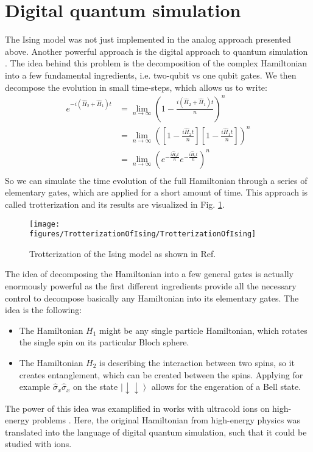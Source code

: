 \documentclass[10pt]{article}
\let\cite\citep
\providecommand\citep{\cite}
\newcommand{\ket}[1]{\ensuremath{\left|#1\right\rangle}}
\begin{document}
\section{Digital quantum simulation}

The Ising model was not just implemented in the analog approach presented above. Another  powerful approach is the digital approach to quantum simulation \cite{Lanyon_2011}.   The idea behind this problem is the decomposition of the complex Hamiltonian into a few fundamental ingredients, i.e. two-qubit vs one qubit gates. We then decompose the evolution in small time-steps, which allows us to write:
\begin{align}
e^{-i(\hat{H}_2 +\hat{H}_1)t}&=\lim_{n\rightarrow \infty}\left(1-\frac{i(\hat{H}_2 +\hat{H}_1)t}{n}\right)^n\\
&=\lim_{n\rightarrow \infty}\left(\left[1-\frac{i\hat{H}_2 t}{n}\right]\left[1-\frac{i\hat{H}_1t}{n}\right]\right)^n\\
&=\lim_{n\rightarrow \infty}\left(e^{-\frac{i\hat{H}_2 t}{n}}e^{-\frac{i\hat{H}_1t}{n}}\right)^n\\
\end{align}
So we can simulate the time evolution of the full Hamiltonian through a series of elementary gates, which are applied for a short amount of time. This approach is called trotterization and its results are visualized in Fig. \ref{866769}.
\begin{figure}[h!]
\begin{center}
\texttt{[image: figures/TrotterizationOfIsing/TrotterizationOfIsing]}
\caption{{Trotterization of the Ising model as shown in Ref. \protect\cite{Lanyon_2011}
{\label{866769}}%
}}
\end{center}
\end{figure}

The idea of decomposing the Hamiltonian into a few general gates is actually enormously powerful as the first different ingredients provide all the necessary control to decompose basically any Hamiltonian into its elementary gates. The idea is the following:
\begin{itemize}
\item The Hamiltonian $H_1$ might be any single particle Hamiltonian, which rotates the single spin on its particular Bloch sphere.
\item The Hamiltonian  $H_2$ is describing the interaction between  two spins, so it creates entanglement, which can be created between the spins. Applying for example $\hat{\sigma}_x\hat{\sigma}_x$ on the state $\ket{\downarrow\downarrow}$ allows for the engeration of a Bell state.
\end{itemize}
The power of this idea was examplified in works with ultracold ions on high-energy problems \cite{Martinez_2016}. Here, the original Hamiltonian from high-energy physics was translated into the language of digital quantum simulation, such that it could be studied with ions.
\end{document}
